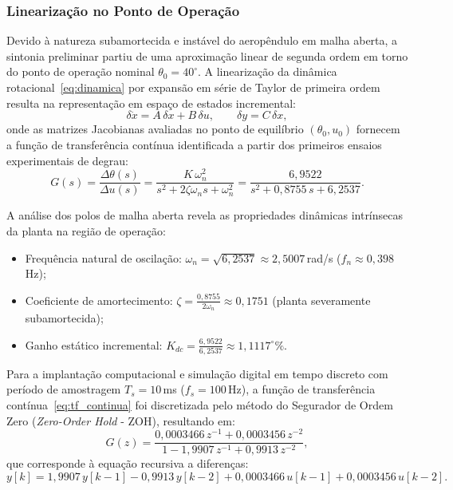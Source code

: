 \subsubsection{Linearização no Ponto de Operação}

Devido à natureza subamortecida e instável do aeropêndulo em malha aberta, a sintonia preliminar partiu de uma aproximação linear de segunda ordem em torno do ponto de operação nominal $\theta_0 = 40^\circ$. A linearização da dinâmica rotacional~\eqref{eq:dinamica} por expansão em série de Taylor de primeira ordem resulta na representação em espaço de estados incremental:
\begin{equation}
    \delta\dot{x} = A\,\delta x + B\,\delta u, \qquad \delta y = C\,\delta x,
    \label{eq:linear_eq}
\end{equation}
\noindent onde as matrizes Jacobianas avaliadas no ponto de equilíbrio $(\theta_0, u_0)$ fornecem a função de transferência contínua identificada a partir dos primeiros ensaios experimentais de degrau:
\begin{equation}
    G(s) = \frac{\Delta\theta(s)}{\Delta u(s)} = \frac{K\,\omega_n^2}{s^2 + 2\zeta\omega_n s + \omega_n^2} = \frac{6{,}9522}{s^2 + 0{,}8755\,s + 6{,}2537}.
    \label{eq:tf_continua}
\end{equation}

A análise dos polos de malha aberta revela as propriedades dinâmicas intrínsecas da planta na região de operação:
\begin{itemize}
    \item Frequência natural de oscilação: $\omega_n = \sqrt{6{,}2537} \approx 2{,}5007$\,rad/s ($f_n \approx 0{,}398$\,Hz);
    \item Coeficiente de amortecimento: $\zeta = \frac{0{,}8755}{2\omega_n} \approx 0{,}1751$ (planta severamente subamortecida);
    \item Ganho estático incremental: $K_{dc} = \frac{6{,}9522}{6{,}2537} \approx 1{,}1117^\circ\%$.
\end{itemize}

Para a implantação computacional e simulação digital em tempo discreto com período de amostragem $T_s = 10$\,ms ($f_s = 100$\,Hz), a função de transferência contínua~\eqref{eq:tf_continua} foi discretizada pelo método do Segurador de Ordem Zero (\textit{Zero-Order Hold} - ZOH), resultando em:
\begin{equation}
    G(z) = \frac{0{,}0003466\,z^{-1} + 0{,}0003456\,z^{-2}}{1 - 1{,}9907\,z^{-1} + 0{,}9913\,z^{-2}},
    \label{eq:tf_discreta}
\end{equation}
\noindent que corresponde à equação recursiva a diferenças:
\begin{equation}
    y[k] = 1{,}9907\,y[k-1] - 0{,}9913\,y[k-2] + 0{,}0003466\,u[k-1] + 0{,}0003456\,u[k-2].
\end{equation}

